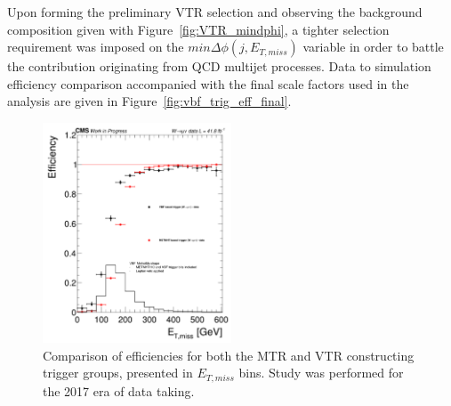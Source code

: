\hspace{10pt} Upon forming the preliminary VTR selection and observing the background composition given with Figure~\ref{fig:VTR_mindphi}, a tighter selection requirement was imposed on the $min\Delta\phi(j, E_{T,miss})$ variable in order to battle the contribution originating from QCD multijet processes. Data to simulation efficiency comparison accompanied with the final scale factors used in the analysis are given in Figure~\ref{fig:vbf_trig_eff_final}.

\begin{figure}[htbp]
  \centering
    \includegraphics[width=0.5\textwidth]{Analysis_strategy/VBF_eff/2017/VBF_vs_METMHT.png}
  \caption{Comparison of efficiencies for both the MTR and VTR constructing trigger groups, presented in $E_{T,miss}$ bins. Study was performed for the 2017 era of data taking.}
  \label{fig:vbf_metmht_comp}
\end{figure}

